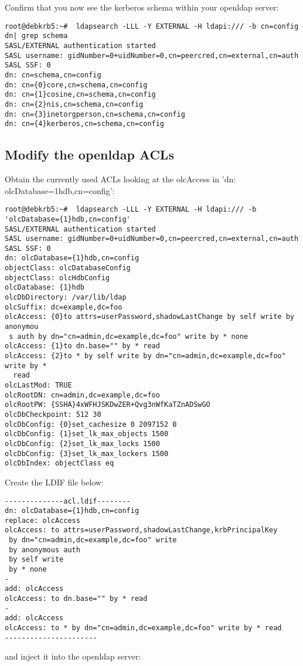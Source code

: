 \documentclass[12pt,a4]{article}
\begin{document}
Confirm that you now see the kerberos schema within your openldap server:

\begin{verbatim}
root@debkrb5:~#  ldapsearch -LLL -Y EXTERNAL -H ldapi:/// -b cn=config dn| grep schema
SASL/EXTERNAL authentication started
SASL username: gidNumber=0+uidNumber=0,cn=peercred,cn=external,cn=auth
SASL SSF: 0
dn: cn=schema,cn=config
dn: cn={0}core,cn=schema,cn=config
dn: cn={1}cosine,cn=schema,cn=config
dn: cn={2}nis,cn=schema,cn=config
dn: cn={3}inetorgperson,cn=schema,cn=config
dn: cn={4}kerberos,cn=schema,cn=config
\end{verbatim}

\subsection{Modify the openldap ACLs}
Obtain the currently used ACLs looking at the olcAccess in 'dn: olcDatabase={1}hdb,cn=config':
\begin{verbatim}
root@debkrb5:~#  ldapsearch -LLL -Y EXTERNAL -H ldapi:/// -b 'olcDatabase={1}hdb,cn=config'
SASL/EXTERNAL authentication started
SASL username: gidNumber=0+uidNumber=0,cn=peercred,cn=external,cn=auth
SASL SSF: 0
dn: olcDatabase={1}hdb,cn=config
objectClass: olcDatabaseConfig
objectClass: olcHdbConfig
olcDatabase: {1}hdb
olcDbDirectory: /var/lib/ldap
olcSuffix: dc=example,dc=foo
olcAccess: {0}to attrs=userPassword,shadowLastChange by self write by anonymou
 s auth by dn="cn=admin,dc=example,dc=foo" write by * none
olcAccess: {1}to dn.base="" by * read
olcAccess: {2}to * by self write by dn="cn=admin,dc=example,dc=foo" write by *
  read
olcLastMod: TRUE
olcRootDN: cn=admin,dc=example,dc=foo
olcRootPW: {SSHA}4xWFHJSKDwZER+Qvg3nWfKaTZnADSwGO
olcDbCheckpoint: 512 30
olcDbConfig: {0}set_cachesize 0 2097152 0
olcDbConfig: {1}set_lk_max_objects 1500
olcDbConfig: {2}set_lk_max_locks 1500
olcDbConfig: {3}set_lk_max_lockers 1500
olcDbIndex: objectClass eq
\end{verbatim}
Create the LDIF file below:
\begin{verbatim}
--------------acl.ldif--------
dn: olcDatabase={1}hdb,cn=config
replace: olcAccess
olcAccess: to attrs=userPassword,shadowLastChange,krbPrincipalKey 
 by dn="cn=admin,dc=example,dc=foo" write 
 by anonymous auth 
 by self write 
 by * none
-
add: olcAccess
olcAccess: to dn.base="" by * read
-
add: olcAccess
olcAccess: to * by dn="cn=admin,dc=example,dc=foo" write by * read
----------------------
\end{verbatim}
and inject it into the openldap server:
\end{document}
